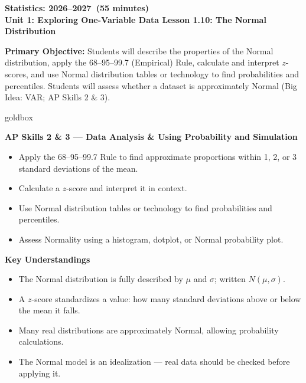\documentclass[10pt]{article}
\begin{document}
\def\CourseName{Statistics}
\def\SchoolYear{2026--2027}
\def\MeetingLength{55 minutes}
\newcommand{\UnitNumberName}{Unit 1: Exploring One-Variable Data \quad}
\newcommand{\LessonNumberName}{Lesson 1.10: The Normal Distribution}

\begin{center}
    {\Large\bfseries \CourseName: \SchoolYear\ (\MeetingLength) \\
    {\small\bfseries \UnitNumberName \LessonNumberName}}
\end{center}

\begin{tcolorbox}[colback=sky,colframe=navy,boxrule=0.9pt,arc=2mm,
    left=2mm,right=2mm,top=1.5mm,bottom=1.5mm]
    \textbf{Primary Objective:} Students will describe the properties of the Normal distribution,
    apply the 68--95--99.7 (Empirical) Rule, calculate and interpret $z$-scores, and use Normal
    distribution tables or technology to find probabilities and percentiles. Students will assess
    whether a dataset is approximately Normal (Big Idea: VAR; AP Skills 2 \& 3).
\end{tcolorbox}

\boxguard
\begin{skillbox}{goldbox}
\begin{minipage}[t]{0.48\linewidth}
    \textbf{AP Skills 2 \& 3 --- Data Analysis \& Using Probability and Simulation}
    \begin{itemize}
        \item Apply the 68--95--99.7 Rule to find approximate proportions within 1, 2, or 3 standard deviations of the mean.
        \item Calculate a $z$-score and interpret it in context.
        \item Use Normal distribution tables or technology to find probabilities and percentiles.
        \item Assess Normality using a histogram, dotplot, or Normal probability plot.
    \end{itemize}
\end{minipage}
\hfill
\begin{minipage}[t]{0.48\linewidth}
    \textbf{Key Understandings}
    \begin{itemize}
        \item The Normal distribution is fully described by $\mu$ and $\sigma$; written $N(\mu, \sigma)$.
        \item A $z$-score standardizes a value: how many standard deviations above or below the mean it falls.
        \item Many real distributions are approximately Normal, allowing probability calculations.
        \item The Normal model is an idealization --- real data should be checked before applying it.
    \end{itemize}
\end{minipage}
\end{skillbox}
\end{document}
